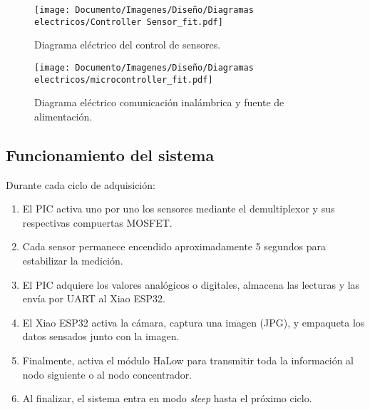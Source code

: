 \begin{figure}[H]
\centering
\texttt{[image: Documento/Imagenes/Diseño/Diagramas electricos/Controller Sensor\_fit.pdf]}
\caption{Diagrama eléctrico del control de sensores.}
\label{fig:esquema_nodo_sensor}
\end{figure}

\begin{figure}[H]
\centering
\texttt{[image: Documento/Imagenes/Diseño/Diagramas electricos/microcontroller\_fit.pdf]}
\caption{Diagrama eléctrico comunicación inalámbrica y fuente de alimentación.}
\label{fig:esquema_nodo_sensor2}
\end{figure}


\subsection*{Funcionamiento del sistema}

Durante cada ciclo de adquisición:

\begin{enumerate}
    \item El PIC activa uno por uno los sensores mediante el demultiplexor y sus respectivas compuertas MOSFET.
    \item Cada sensor permanece encendido aproximadamente 5 segundos para estabilizar la medición.
    \item El PIC adquiere los valores analógicos o digitales, almacena las lecturas y las envía por UART al Xiao ESP32.
    \item El Xiao ESP32 activa la cámara, captura una imagen (JPG), y empaqueta los datos sensados junto con la imagen.
    \item Finalmente, activa el módulo HaLow para transmitir toda la información al nodo siguiente o al nodo concentrador.
    \item Al finalizar, el sistema entra en modo \textit{sleep} hasta el próximo ciclo.
\end{enumerate}



